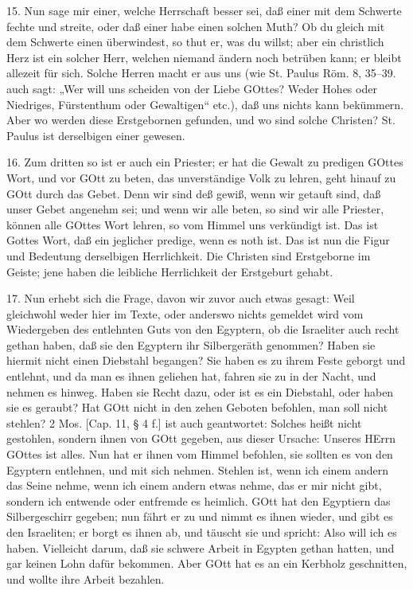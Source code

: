 15. Nun sage mir einer, welche Herrschaft besser sei, daß einer mit dem Schwerte fechte und streite, oder daß einer habe einen solchen Muth? Ob du gleich mit dem Schwerte einen überwindest, so thut er, was du willst; aber ein christlich Herz ist ein solcher Herr, welchen niemand ändern noch betrüben kann; er bleibt allezeit für sich. Solche Herren macht er aus uns (wie St. Paulus Röm. 8, 35–39. auch sagt: „Wer will uns scheiden von der Liebe GOttes? Weder Hohes oder Niedriges, Fürstenthum oder Gewaltigen“ etc.), daß uns nichts kann bekümmern. Aber wo werden diese Erstgebornen gefunden, und wo sind solche Christen? St. Paulus ist derselbigen einer gewesen.

16. Zum dritten so ist er auch ein Priester; er hat die Gewalt zu predigen GOttes Wort, und vor GOtt zu beten, das unverständige Volk zu lehren, geht hinauf zu GOtt durch das Gebet. Denn wir sind deß gewiß, wenn wir getauft sind, daß unser Gebet angenehm sei; und wenn wir alle beten, so sind wir alle Priester, können alle GOttes Wort lehren, so vom Himmel uns verkündigt ist. Das ist Gottes Wort, daß ein jeglicher predige, wenn es noth ist. Das ist nun die Figur und Bedeutung derselbigen Herrlichkeit. Die Christen sind Erstgeborne im Geiste; jene haben die leibliche Herrlichkeit der Erstgeburt gehabt.

17. Nun erhebt sich die Frage, davon wir zuvor auch etwas gesagt: Weil gleichwohl weder hier im Texte, oder anderswo nichts gemeldet wird vom Wiedergeben des entlehnten Guts von den Egyptern, ob die Israeliter auch recht gethan haben, daß sie den Egyptern ihr Silbergeräth genommen? Haben sie hiermit nicht einen Diebstahl begangen? Sie haben es zu ihrem Feste geborgt und entlehnt, und da man es ihnen geliehen hat, fahren sie zu in der Nacht, und nehmen es hinweg. Haben sie Recht dazu, oder ist es ein Diebstahl, oder haben sie es geraubt? Hat GOtt nicht in den zehen Geboten befohlen, man soll nicht stehlen? 2 Mos. [Cap. 11, § 4 f.] ist auch geantwortet: Solches heißt nicht gestohlen, sondern ihnen von GOtt gegeben, aus dieser Ursache: Unseres HErrn GOttes ist alles. Nun hat er ihnen vom Himmel befohlen, sie sollten es von den Egyptern entlehnen, und mit sich nehmen. Stehlen ist, wenn ich einem andern das Seine nehme, wenn ich einem andern etwas nehme, das er mir nicht gibt, sondern ich entwende oder entfremde es
heimlich. GOtt hat den Egyptiern das Silbergeschirr gegeben; nun fährt er zu und nimmt es ihnen wieder, und gibt es den Israeliten; er borgt es ihnen ab, und täuscht sie und spricht: Also will ich es haben. Vielleicht darum, daß sie schwere Arbeit in Egypten gethan hatten, und gar keinen Lohn dafür bekommen. Aber GOtt hat es an ein Kerbholz geschnitten, und wollte ihre Arbeit bezahlen.

